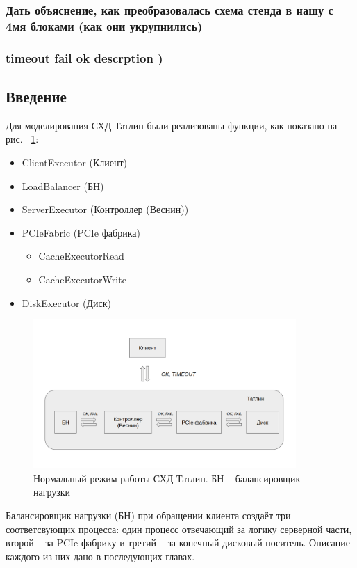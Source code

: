 \subsubsection{Дать объяснение, как преобразовалась схема стенда в нашу с 4мя блоками (как они укрупнились)}


\subsubsection{timeout fail ok descrption )}

\subsection{Введение}

Для моделирования СХД Татлин были реализованы функции, как показано на рис.  ~\ref{fig:norm-tatlin}:

\begin{itemize}
\item ClientExecutor (Клиент) 
\item LoadBalancer (БН)
\item ServerExecutor (Контроллер (Веснин))
\item PCIeFabric (PCIe фабрика)
\begin{itemize}
\item CacheExecutorRead
\item CacheExecutorWrite
\end{itemize}
\item DiskExecutor (Диск)
\end{itemize}



\begin{figure}[!ht]
\centering
\includegraphics[width=10cm]{Kenenbek/images/norm.png}
\caption{Нормальный режим работы СХД Татлин. БН -- балансировщик нагрузки}
\label{fig:norm-tatlin}
\end{figure}

Балансировщик нагрузки (БН) при обращении клиента создаёт три соответсвующих процесса: один процесс отвечающий за логику серверной части, второй -- за PCIe фабрику и третий -- за конечный дисковый носитель. Описание каждого из них дано в последующих главах.

